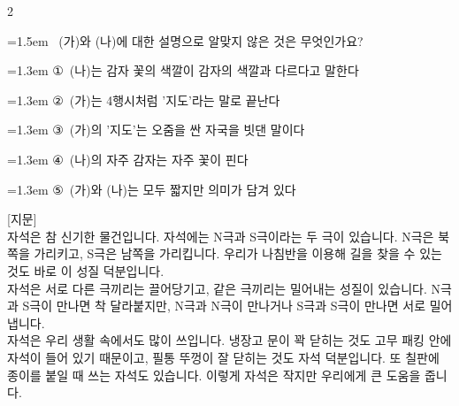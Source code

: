 \documentclass[12pt, a4paper]{article}
\begin{document}
\begin{multicols}{2}
\noindent\begin{minipage}{\columnwidth}
\vspace{2mm}
{\hangindent=1.5em  ~(가)와 (나)에 대한 설명으로 알맞지 않은 것은 무엇인가요?\par}

\vspace{0.5mm}
{\hangindent=1.3em  \noindent\hspace{0.3em}①~(나)는 감자 꽃의 색깔이 감자의 색깔과 다르다고 말한다\par}
{\hangindent=1.3em  \noindent\hspace{0.3em}②~(가)는 4행시처럼 '지도'라는 말로 끝난다\par}
{\hangindent=1.3em  \noindent\hspace{0.3em}③~(가)의 '지도'는 오줌을 싼 자국을 빗댄 말이다\par}
{\hangindent=1.3em  \noindent\hspace{0.3em}④~(나)의 자주 감자는 자주 꽃이 핀다\par}
{\hangindent=1.3em  \noindent\hspace{0.3em}⑤~(가)와 (나)는 모두 짧지만 의미가 담겨 있다\par}
\vspace{4mm}
\end{minipage}
\par


\vspace{1mm}
\vspace{0.5mm}

\begin{passagebox}
\noindent{}[지문] \\
자석은 참 신기한 물건입니다. 자석에는 N극과 S극이라는 두 극이 있습니다. N극은 북쪽을 가리키고, S극은 남쪽을 가리킵니다. 우리가 나침반을 이용해 길을 찾을 수 있는 것도 바로 이 성질 덕분입니다.
\\[0.5em]
자석은 서로 다른 극끼리는 끌어당기고, 같은 극끼리는 밀어내는 성질이 있습니다. N극과 S극이 만나면 착 달라붙지만, N극과 N극이 만나거나 S극과 S극이 만나면 서로 밀어냅니다.
\\[0.5em]
자석은 우리 생활 속에서도 많이 쓰입니다. 냉장고 문이 꽉 닫히는 것도 고무 패킹 안에 자석이 들어 있기 때문이고, 필통 뚜껑이 잘 닫히는 것도 자석 덕분입니다. 또 칠판에 종이를 붙일 때 쓰는 자석도 있습니다. 이렇게 자석은 작지만 우리에게 큰 도움을 줍니다.
\end{passagebox}
\vspace{1mm}


\end{multicols}
\end{document}
